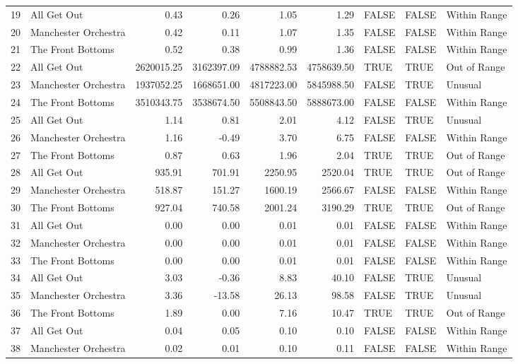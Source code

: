 \documentclass{article}\usepackage[]{graphicx}\usepackage[]{xcolor}
\begin{document}
\begin{table}[H]
\begin{tabular}{rlrrrrlll}
  19 & All Get Out & 0.43 & 0.26 & 1.05 & 1.29 & FALSE & FALSE & Within Range \\ 
  20 & Manchester Orchestra & 0.42 & 0.11 & 1.07 & 1.35 & FALSE & FALSE & Within Range \\ 
  21 & The Front Bottoms & 0.52 & 0.38 & 0.99 & 1.36 & FALSE & FALSE & Within Range \\ 
  22 & All Get Out & 2620015.25 & 3162397.09 & 4788882.53 & 4758639.50 & TRUE & TRUE & Out of Range \\ 
  23 & Manchester Orchestra & 1937052.25 & 1668651.00 & 4817223.00 & 5845988.50 & FALSE & TRUE & Unusual \\ 
  24 & The Front Bottoms & 3510343.75 & 3538674.50 & 5508843.50 & 5888673.00 & FALSE & FALSE & Within Range \\ 
  25 & All Get Out & 1.14 & 0.81 & 2.01 & 4.12 & FALSE & TRUE & Unusual \\ 
  26 & Manchester Orchestra & 1.16 & -0.49 & 3.70 & 6.75 & FALSE & FALSE & Within Range \\ 
  27 & The Front Bottoms & 0.87 & 0.63 & 1.96 & 2.04 & TRUE & TRUE & Out of Range \\ 
  28 & All Get Out & 935.91 & 701.91 & 2250.95 & 2520.04 & TRUE & TRUE & Out of Range \\ 
  29 & Manchester Orchestra & 518.87 & 151.27 & 1600.19 & 2566.67 & FALSE & FALSE & Within Range \\ 
  30 & The Front Bottoms & 927.04 & 740.58 & 2001.24 & 3190.29 & TRUE & TRUE & Out of Range \\ 
  31 & All Get Out & 0.00 & 0.00 & 0.01 & 0.01 & FALSE & FALSE & Within Range \\ 
  32 & Manchester Orchestra & 0.00 & 0.00 & 0.01 & 0.01 & FALSE & FALSE & Within Range \\ 
  33 & The Front Bottoms & 0.00 & 0.00 & 0.01 & 0.01 & FALSE & FALSE & Within Range \\ 
  34 & All Get Out & 3.03 & -0.36 & 8.83 & 40.10 & FALSE & TRUE & Unusual \\ 
  35 & Manchester Orchestra & 3.36 & -13.58 & 26.13 & 98.58 & FALSE & TRUE & Unusual \\ 
  36 & The Front Bottoms & 1.89 & 0.00 & 7.16 & 10.47 & TRUE & TRUE & Out of Range \\ 
  37 & All Get Out & 0.04 & 0.05 & 0.10 & 0.10 & FALSE & FALSE & Within Range \\ 
  38 & Manchester Orchestra & 0.02 & 0.01 & 0.10 & 0.11 & FALSE & FALSE & Within Range \\ 

\end{tabular}
\end{table}
\end{document}
